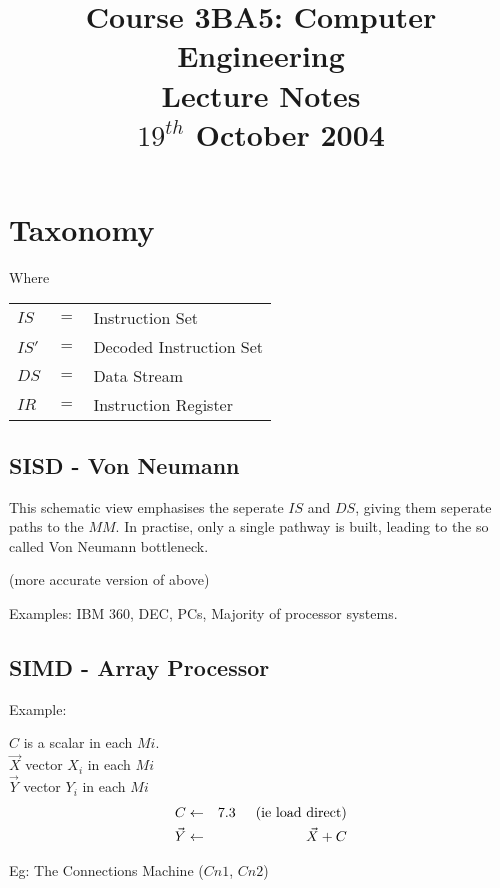 \documentclass[a4paper,12pt]{article}
\begin{document}
\title{Course 3BA5: Computer Engineering \\ Lecture Notes \\ $19^{th}$ October 2004}

\maketitle

\section*{Taxonomy}

\begin{table}[hbtp]


\end{table}

Where

\begin{tabular}{lll}
$IS$	&	$=$	&	Instruction Set			\\
$IS'$	&	$=$	&	Decoded Instruction Set	\\
$DS$	&	$=$	&	Data Stream					\\
$IR$	&	$=$	&	Instruction Register		\\
\end{tabular}

\subsection*{SISD - Von Neumann}

This schematic view emphasises the seperate $IS$ and $DS$, giving them
seperate paths to the $MM$. In practise, only a single pathway is built,
leading to the so called Von Neumann bottleneck.


(more accurate version of above)

Examples: IBM 360, DEC, PCs, Majority of processor systems.

\subsection*{SIMD - Array Processor}


Example:

$C$ is a scalar in each $Mi$.				\\
$\vec{X}$ vector $X_{i}$ in each $Mi$	\\
$\vec{Y}$ vector $Y_{i}$ in each $Mi$	\\

\begin{eqnarray*}
C			&	\leftarrow	&	7.3 \mbox{\hspace{5mm}(ie load direct)}	\\
\vec{Y}	&	\leftarrow	&	\vec{X} + C						
\end{eqnarray*}

Eg: The Connections Machine ($Cn1$, $Cn2$)
\end{document}
